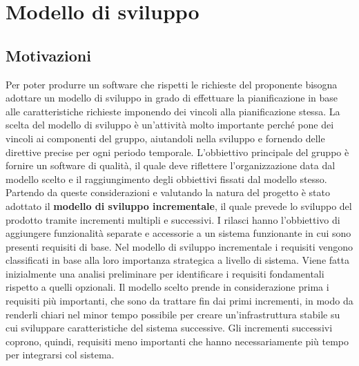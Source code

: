 \section{Modello di sviluppo} \label{_modelloDiSviluppo}
\subsection{Motivazioni}
	Per poter produrre un software che rispetti le richieste del proponente bisogna adottare un modello di sviluppo in grado di effettuare la pianificazione in base alle caratteristiche richieste imponendo dei vincoli alla pianificazione stessa. La scelta del modello di sviluppo è un'attività molto importante perché pone dei vincoli ai componenti del gruppo, aiutandoli nella sviluppo e fornendo delle direttive precise per ogni periodo temporale. L'obbiettivo principale del gruppo è fornire un software di qualità, il quale deve riflettere l'organizzazione data dal modello scelto e il raggiungimento degli obbiettivi fissati dal modello stesso.
	\newline
	Partendo da queste considerazioni e valutando la natura del progetto è stato adottato il \textbf{modello di sviluppo incrementale}, il quale prevede lo sviluppo del prodotto tramite incrementi multipli e successivi. I rilasci hanno l’obbiettivo di
aggiungere funzionalità separate e accessorie a un sistema funzionante in cui sono presenti requisiti di base.
	\newline
	Nel modello di sviluppo incrementale i requisiti vengono classificati in base alla loro importanza strategica a livello di sistema. Viene fatta inizialmente una analisi preliminare per identificare i requisiti fondamentali rispetto a quelli opzionali. Il modello scelto prende in considerazione prima i requisiti più importanti, che sono da trattare fin dai primi incrementi, in modo da renderli chiari nel minor tempo possibile per creare un'infrastruttura stabile su cui sviluppare caratteristiche del sistema successive. Gli incrementi successivi coprono, quindi, requisiti meno importanti che hanno necessariamente più tempo per integrarsi col sistema.
